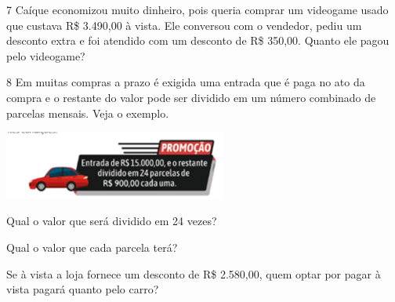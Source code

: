 
\num{7} Caíque economizou muito dinheiro, pois queria comprar um videogame usado
que custava R\$ 3.490,00 à vista. Ele conversou com o vendedor, pediu
um desconto extra e foi atendido com um desconto de R\$ 350,00. Quanto ele pagou pelo videogame?


\num{8} Em muitas compras a prazo é exigida uma entrada que é paga no ato da
compra e o restante do valor pode ser dividido em um número combinado de
parcelas mensais. Veja o exemplo.

\includegraphics[width=2.90025in,height=0.89174in]{./media/image76.png}


\begin{escolha}
\item Qual o valor que será dividido em 24 vezes?


\item Qual o valor que cada parcela terá?


\item Se à vista a loja fornece um desconto de R\$ 2.580,00, quem optar por
  pagar à vista pagará quanto pelo carro?

\end{escolha}

